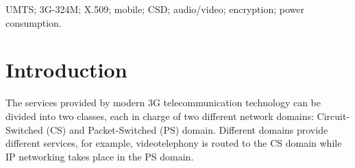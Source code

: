 \documentclass[10pt, conference, compsocconf]{IEEEtran}
\begin{document}
\begin{abstract}


\end{abstract}

\begin{IEEEkeywords}
UMTS; 3G-324M; X.509; mobile; CSD; audio/video; encryption; power consumption.

\end{IEEEkeywords}

\section{Introduction}
\label{par:intro}


The services provided by modern 3G telecommunication technology can be divided into two classes, each in charge of two different network domains: Circuit-Switched (CS) and Packet-Switched (PS) domain. Different domains provide different services, for example, videotelephony is routed to the CS domain while IP networking takes place in the PS domain.
\end{document}
